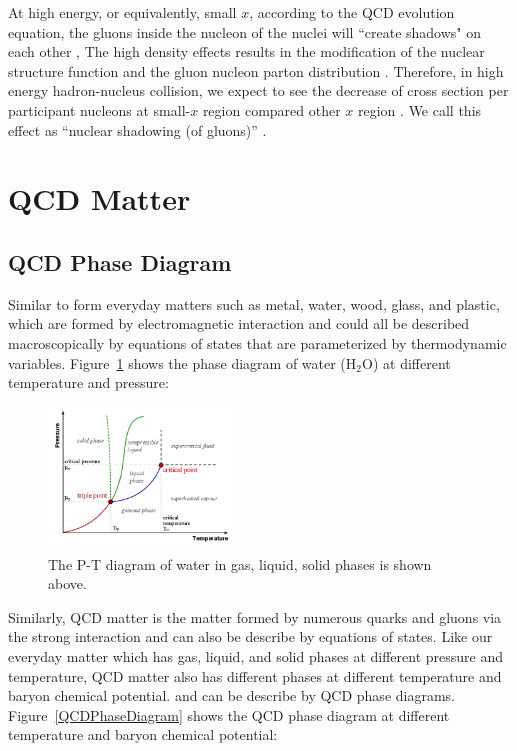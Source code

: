 At high energy, or equivalently, small $x$, according to the QCD evolution equation, the gluons inside the nucleon of the nuclei will ``create shadows" on each other \cite{IntroShadow}, The high density effects results in the modification of the nuclear structure function and the gluon nucleon parton distribution \cite{DenseQCD}. Therefore, in high energy hadron-nucleus collision, we expect to see the decrease of cross section per participant nucleons at small-$x$ region compared other $x$ region \cite{ExShadow}. We call this effect as ``nuclear shadowing (of gluons)'' \cite{NuclearShadowing}. 



\section{QCD Matter}

\subsection{QCD Phase Diagram}

Similar to form everyday matters such as metal, water, wood, glass, and plastic, which are formed by electromagnetic interaction and could all be described macroscopically by equations of states that are parameterized by thermodynamic variables. Figure~\ref{QEDPhaseDiagram} shows the phase diagram of water ($\mathrm{H_2O}$) at different temperature and pressure:

\begin{figure}[hbtp]
\begin{center}
\includegraphics[width=0.45\textwidth]{Figures/Chapter1/WaterPhaseDiagram.png}
\caption{The P-T diagram of water in gas, liquid, solid phases is shown above.}
\label{QEDPhaseDiagram}
\end{center}
\end{figure} 


Similarly, QCD matter is the matter formed by numerous quarks and gluons via the strong interaction and can also be describe by equations of states. Like our everyday matter which has gas, liquid, and solid phases at different pressure and temperature, QCD matter also has different phases at different temperature and baryon chemical potential. and can be describe by QCD phase diagrams. Figure~\ref{QCDPhaseDiagram} shows the QCD phase diagram at different temperature and baryon chemical potential:

